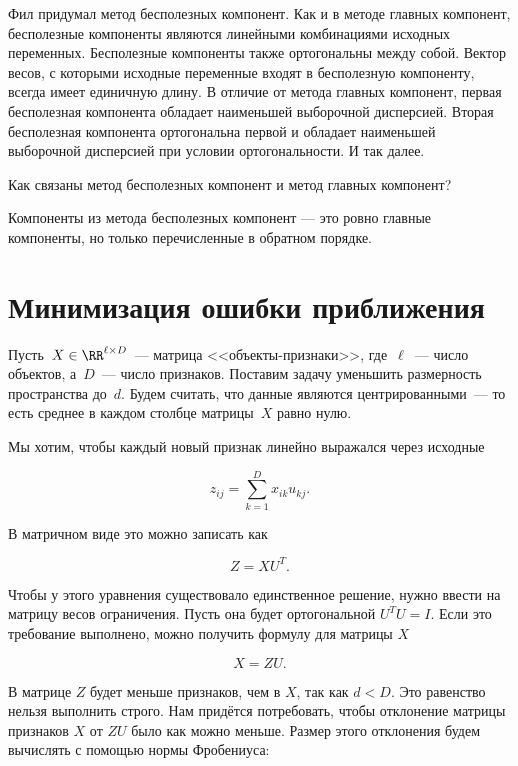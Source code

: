\documentclass[12pt,fleqn]{article}
\begin{document}
\begin{vkProblem} 
    Фил придумал метод бесполезных компонент. Как и в методе главных компонент, бесполезные компоненты являются линейными комбинациями исходных переменных. Бесполезные компоненты также ортогональны между собой. Вектор весов, с которыми исходные переменные входят в бесполезную компоненту, всегда имеет единичную длину. В отличие от метода главных компонент, первая бесполезная компонента обладает наименьшей выборочной дисперсией. Вторая бесполезная компонента ортогональна первой и обладает наименьшей выборочной дисперсией при условии ортогональности. И так далее. 
    
    Как связаны метод бесполезных компонент и метод главных компонент?
\end{vkProblem}
\begin{esSolution}
Компоненты из метода бесполезных компонент --- это ровно главные компоненты, но только перечисленные в обратном порядке. 
\end{esSolution}


\section{Минимизация ошибки приближения}

Пусть~$X \in \RR^{\ell \times D}$~--- матрица <<объекты-признаки>>, где~$\ell$~--- число объектов, а~$D$~--- число признаков. Поставим задачу уменьшить размерность пространства до~$d$. Будем считать, что данные являются центрированными~--- то есть среднее в каждом столбце матрицы~$X$ равно нулю.

Мы хотим, чтобы каждый новый признак линейно выражался через исходные

$$
z_{ij} = \sum_{k = 1}^{D} x_{ik} u_{kj}.
$$

В матричном виде это можно записать как 

$$
Z = XU^T.
$$

Чтобы у этого уравнения существовало единственное решение, нужно ввести на матрицу весов ограничения. Пусть она будет ортогональной $U^T U = I$. Если это требование выполнено, можно получить формулу для матрицы $X$

$$
X = ZU.
$$

В матрице $Z$ будет меньше признаков, чем в $X$, так как $d < D.$ Это равенство нельзя выполнить строго. Нам придётся потребовать, чтобы отклонение матрицы признаков $X$ от $ZU$ было как можно меньше. Размер этого отклонения будем вычислять с помощью нормы Фробениуса: 
\end{document}
